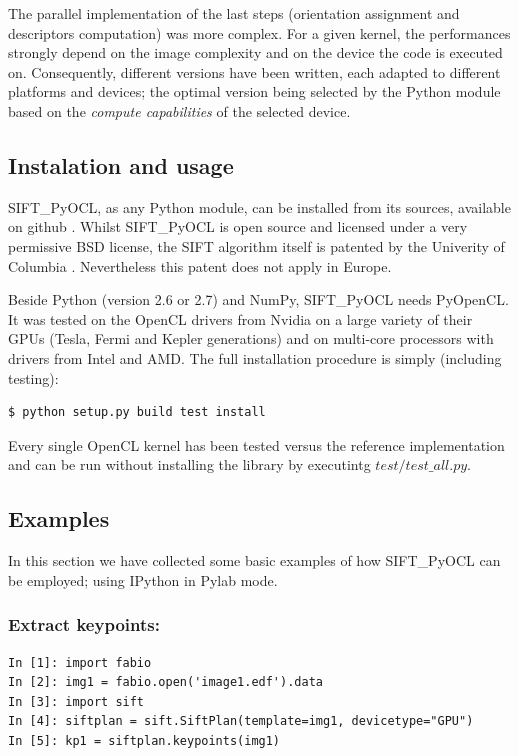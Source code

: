 \documentclass[preprint]{iucr}
\begin{document}
The parallel implementation of the last steps (orientation assignment and 
descriptors computation) was more complex. 
For a given kernel, the performances strongly depend on the image
complexity and on the device the code is executed on. 
Consequently, different versions have been written, each adapted to 
different platforms and
devices; the optimal version being selected by the
Python module based on the \emph{compute capabilities} of the selected device.


\subsection{Instalation and usage}
SIFT\_PyOCL, as any Python module, can be installed from its sources,
available on github \cite{sift_pyocl}.
Whilst SIFT\_PyOCL is open source and licensed under a very
permissive BSD license, the SIFT algorithm itself is
patented by the Univerity of Columbia \cite{SIFT_pat}. 
Nevertheless this patent does not apply in Europe.

Beside Python (version 2.6 or 2.7) and NumPy, SIFT\_PyOCL needs
PyOpenCL.
It was tested on the OpenCL drivers from Nvidia on a
large variety of their GPUs (Tesla, Fermi and Kepler generations) and on
multi-core processors with drivers from Intel and AMD. 
The full installation procedure is simply (including testing):  
\begin{verbatim}
$ python setup.py build test install
\end{verbatim}
Every single OpenCL kernel has been tested versus the reference
implementation and can be run without installing the library by
executintg $test/test\_all.py$. 

\subsection{Examples}

In this section we have collected some basic examples of how
SIFT\_PyOCL can be employed; using IPython \cite{ipython} in
Pylab \cite{matplotlib} mode.

\subsubsection{Extract keypoints:}
\begin{verbatim}
In [1]: import fabio 
In [2]: img1 = fabio.open('image1.edf').data
In [3]: import sift
In [4]: siftplan = sift.SiftPlan(template=img1, devicetype="GPU")
In [5]: kp1 = siftplan.keypoints(img1)
\end{verbatim}
\end{document}
